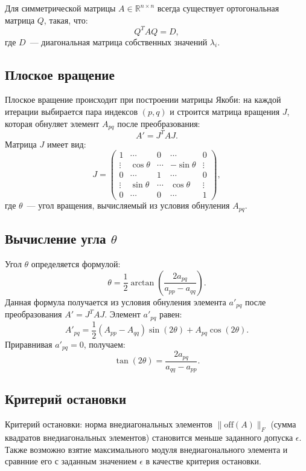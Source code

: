 \documentclass[a4paper, 12pt]{report}
\begin{document}
Для симметрической матрицы \( A \in \mathbb{R}^{n \times n} \) всегда существует ортогональная матрица \( Q \), такая, что:
\[
Q^T A Q = D,
\]
где \( D \)~--- диагональная матрица собственных значений \( \lambda_i \).

\subsection*{Плоское вращение}
Плоское вращение происходит при построении матрицы Якоби: на каждой итерации выбирается пара индексов \( (p, q) \) и строится матрица вращения \( J \), которая обнуляет элемент \( A_{pq} \) после преобразования: 
\[
A' = J^T A J.
\]
Матрица \( J \) имеет вид:
\[
J = 
\begin{pmatrix}
1         & \cdots  & 0        & \cdots  & 0         \\
\vdots    & \cos\theta & \cdots  & -\sin\theta & \vdots    \\
0         & \cdots  & 1        & \cdots  & 0         \\
\vdots    & \sin\theta & \cdots  & \cos\theta & \vdots    \\
0         & \cdots  & 0        & \cdots  & 1
\end{pmatrix},
\]
где \( \theta \)~--- угол вращения, вычисляемый из условия обнуления \( A_{pq} \).

\subsection*{Вычисление угла \( \theta \)}
Угол \( \theta \) определяется формулой:
\[
\theta = \frac{1}{2} \arctan\left(\frac{2a_{pq}}{a_{pp} - a_{qq}}\right).
\]
Данная формула получается из условия обнуления элемента \( a'_{pq} \) после преобразования \( A' = J^T A J \). Элемент \( a'_{pq} \) равен:
\[
A'_{pq} = \frac{1}{2}(A_{pp} - A_{qq}) \sin(2\theta) + A_{pq} \cos(2\theta).
\]
Приравнивая \( a'_{pq} = 0 \), получаем:
\[
\tan(2\theta) = \frac{2a_{pq}}{a_{qq} - a_{pp}}.
\]

\subsection*{Критерий остановки}
Критерий остановки: норма внедиагональных элементов \( \| \text{off}(A) \|_F \) (сумма квадратов внедиагональных элементов) становится меньше заданного допуска \( \epsilon \). Также
возможно взятие максимального модуля внедиагонального элемента и сравнние его с заданным значением $\epsilon$ в качестве критерия остановки.
\end{document}
